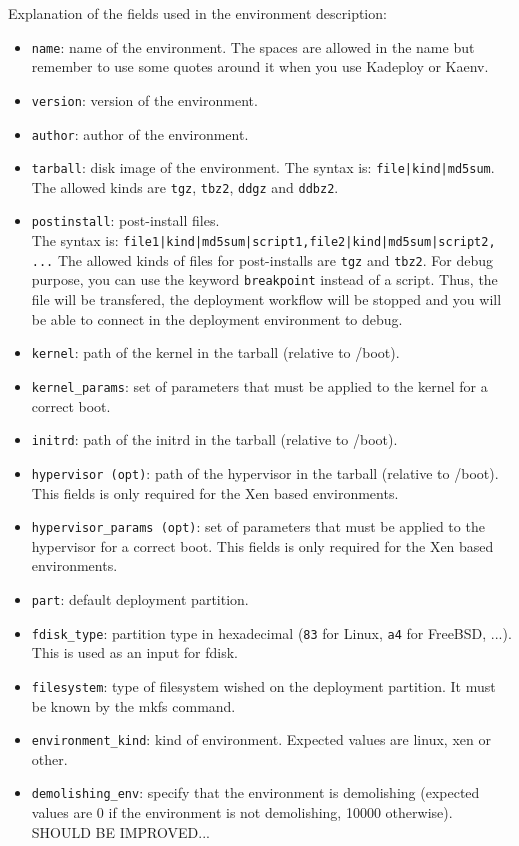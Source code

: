 \documentclass[a4wide,10pt,oneside]{book}
\begin{document}
Explanation of the fields used in the environment description:
\begin{itemize}
\item \texttt{name}: name of the environment. The spaces are allowed in the name but remember to use some quotes around it when you use Kadeploy or Kaenv.
\item \texttt{version}: version of the environment.
\item \texttt{author}: author of the environment.
\item \texttt{tarball}: disk image of the environment. The syntax is: \texttt{file|kind|md5sum}. The allowed kinds are \texttt{tgz}, \texttt{tbz2}, \texttt{ddgz} and \texttt{ddbz2}.
\item \texttt{postinstall}: post-install files.\\ The syntax is: \texttt{file1|kind|md5sum|script1,file2|kind|md5sum|script2, ...} The allowed kinds of files for post-installs are \texttt{tgz} and \texttt{tbz2}. For debug purpose, you can use the keyword \texttt{breakpoint} instead of a script. Thus, the file will be transfered, the deployment workflow will be stopped and you will be able to connect in the deployment environment to debug.
\item \texttt{kernel}: path of the kernel in the tarball (relative to /boot).
\item \texttt{kernel\_params}: set of parameters that must be applied to the kernel for a correct boot.
\item \texttt{initrd}: path of the initrd in the tarball (relative to /boot).
\item \texttt{hypervisor (opt)}: path of the hypervisor in the tarball (relative to /boot). This fields is only required for the Xen based environments.
\item \texttt{hypervisor\_params (opt)}: set of parameters that must be applied to the hypervisor for a correct boot. This fields is only required for the Xen based environments.
\item \texttt{part}: default deployment partition.
\item \texttt{fdisk\_type}: partition type in hexadecimal (\texttt{83} for Linux, \texttt{a4} for FreeBSD, ...). This is used as an input for fdisk.
\item \texttt{filesystem}: type of filesystem wished on the deployment partition. It must be known by the mkfs command.
\item \texttt{environment\_kind}: kind of environment. Expected values are linux, xen or other.
\item \texttt{demolishing\_env}: specify that the environment is demolishing (expected values are 0 if the environment is not demolishing, 10000 otherwise). SHOULD BE IMPROVED...
\end{itemize}
\end{document}
